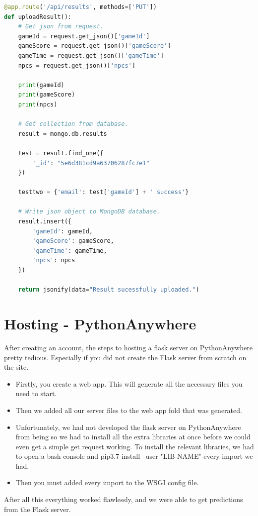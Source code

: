 \begin{lstlisting}[caption={Flask PUT request to Push Data to MongoDB},label={lst:flask3},language=python]
@app.route('/api/results', methods=['PUT'])
def uploadResult():
    # Get json from request.
    gameId = request.get_json()['gameId']
    gameScore = request.get_json()['gameScore']
    gameTime = request.get_json()['gameTime']
    npcs = request.get_json()['npcs']

    print(gameId)
    print(gameScore)
    print(npcs)

    # Get collection from database.
    result = mongo.db.results

    test = result.find_one({
        '_id': "5e6d381cd9a63706287fc7e1"
    })

    testtwo = {'email': test['gameId'] + ' success'}

    # Write json object to MongoDB database.
    result.insert({
        'gameId': gameId,
        'gameScore': gameScore,
        'gameTime': gameTime,
        'npcs': npcs
    })

    return jsonify(data="Result sucessfully uploaded.")
\end{lstlisting}

\section{Hosting - PythonAnywhere}
After creating an account, the steps to hosting a flask server on PythonAnywhere pretty tedious. Especially if you did not create the Flask server from scratch on the site.

\begin{itemize}
    \item Firstly, you create a web app. This will generate all the necessary files you need to start.
    \item Then we added all our server files to the web app fold that was generated.
    \item Unfortunately, we had not developed the flask server on PythonAnywhere from being so we had to install all the extra libraries at once before we could even get a simple get request working. To install the relevant libraries, we had to open a bash console and pip3.7 install --user "LIB-NAME" every import we had.
    \item Then you must added every import to the WSGI config file.
\end{itemize}
After all this everything worked flawlessly, and we were able to get predictions from the Flask server.

